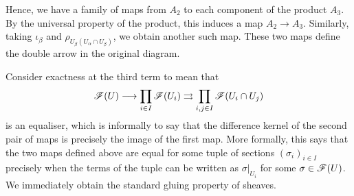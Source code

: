 \documentclass[a4paper]{article}
\begin{document}
Hence, we have a family of maps from $A_2$ to each component of the product $A_3$. By the universal property of the product, this induces a map $A_2 \to A_3$. Similarly, taking $\iota_\beta$ and $\rho_{U_\beta (U_\alpha \cap U_\beta)}$, we obtain another such map. These two maps define the double arrow in the original diagram.

Consider exactness at the third term to mean that
\[
    \mathscr{F}(U) \longrightarrow \prod_{i\in I} \mathscr{F}(U_i) \rightrightarrows \prod_{i,j \in I} \mathscr{F}(U_i \cap U_j)
\]
is an equaliser, which is informally to say that the difference kernel of the second pair of maps is precisely the image of the first map. More formally, this says that the two maps defined above are equal for some tuple of sections $(\sigma_i)_{i\in I}$ precisely when the terms of the tuple can be written as $\sigma|_{U_i}$ for some $\sigma \in \mathscr{F}(U)$. We immediately obtain the standard gluing property of sheaves.
\end{document}
